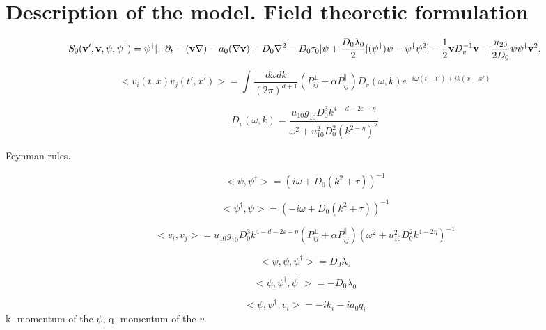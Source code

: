 \documentclass[12pt]{article}
\def\epsilon{\varepsilon}
\def\bfv{{\bf v}}
\begin{document}
\section{Description of the model. Field theoretic formulation}
\label{sec:QFT}

\begin{equation}
    S_{0}(\bfv ',\bfv,\psi,\psi^{\dagger})=
    \psi^{\dagger}[-\partial_t-(\bfv\nabla)-a_0(\nabla\bfv)+D_{0}\nabla^2-D_{0}\tau_{0}]\psi
    +\frac{D_{0}\lambda_{0}}{2}[(\psi^{\dagger})\psi-\psi^{\dagger}\psi^2] 
    -\frac{1}{2}\bfv D^{-1}_{v}\bfv
    +\frac{u_{20}}{2D_{0}}\psi\psi^{\dagger}\bfv^2.
    \label{action}
\end{equation}

\begin{equation}
    <v_{i}(t,x)v_{j}(t',x')>=\int \frac {d \omega dk}{(2\pi)^{d+1}}
    (P_{ij}^{\perp}+\alpha P_{ij}^{\parallel})D_{v}(\omega,k)e^{-i \omega (t-t')+ik(x-x')}
\end{equation}

\begin{equation}
    D_v(\omega,k) = \frac{u_{10}g_{10}D^{3}_{0}k^{4-d-2\epsilon-\eta}}{\omega^2+u_{10}^{2}D_{0}^{2}(k^{2-\eta})^2} 
\end{equation}

Feynman rules. 

\begin{equation}
    <\psi, \psi^{\dagger}> = (i \omega+D_{0}(k^2+\tau))^{-1}
\end{equation}

\begin{equation}
    <\psi^{\dagger}, \psi> = (-i \omega+D_{0}(k^2+\tau))^{-1}
\end{equation}

\begin{equation}
    <v_{i}, v_{j}> = 
    u_{10}g_{10}D_{0}^{3}k^{4-d-2\epsilon-\eta}(P_{ij}^{\perp}+\alpha P_{ij}^{\parallel})
    (\omega^2+u_{10}^{2}D_{0}^{2}k^{4-2\eta})^{-1}
\end{equation}

\begin{equation}
    <\psi, \psi, \psi^{\dagger}>= D_{0}\lambda_{0}
\end{equation}

\begin{equation}
    <\psi, \psi^{\dagger}, \psi^{\dagger}>= -D_{0}\lambda_{0}
\end{equation}

\begin{equation}
    <\psi, \psi^{\dagger}, v_{i}>= -ik_{i}-ia_{0}q_{i}
\end{equation}
k- momentum of the $\psi$, q- momentum of the $v$.
\end{document}
